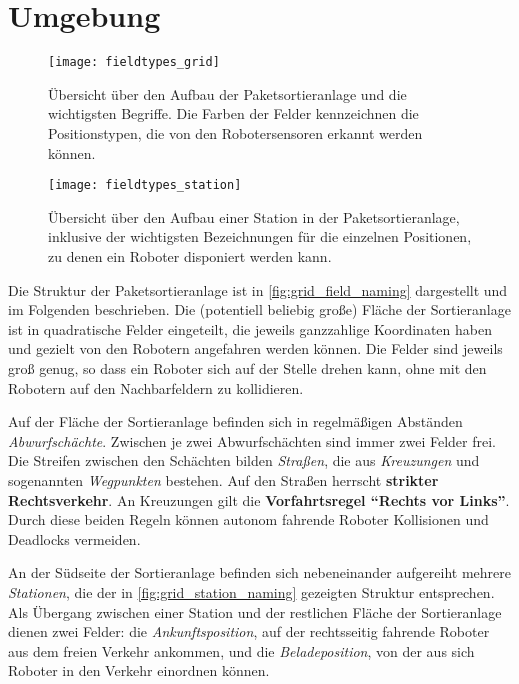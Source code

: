 

\section*{Umgebung}

\begin{figure}
	\centering
	\texttt{[image: fieldtypes\_grid]}
	\caption{Übersicht über den Aufbau der Paketsortieranlage und die wichtigsten Begriffe. Die Farben der Felder kennzeichnen die Positionstypen, die von den Robotersensoren erkannt werden können.}
	\label{fig:grid_field_naming}
\end{figure}



\begin{figure}
    \centering
	\texttt{[image: fieldtypes\_station]}
	\caption{Übersicht über den Aufbau einer Station in der Paketsortieranlage, inklusive der wichtigsten Bezeichnungen für die einzelnen Positionen, zu denen ein Roboter disponiert werden kann.}
	\label{fig:grid_station_naming}
\end{figure}

Die Struktur der Paketsortieranlage ist in \autoref{fig:grid_field_naming} dargestellt und im Folgenden beschrieben. 
Die (potentiell beliebig große) Fläche der Sortieranlage ist in quadratische Felder eingeteilt, die jeweils ganzzahlige Koordinaten haben und gezielt von den Robotern angefahren werden können. 
Die Felder sind jeweils groß genug, so dass ein Roboter sich auf der Stelle drehen kann, ohne mit den Robotern auf den Nachbarfeldern zu kollidieren.

Auf der Fläche der Sortieranlage befinden sich in regelmäßigen Abständen \emph{Abwurfschächte}. 
Zwischen je zwei Abwurfschächten sind immer zwei Felder frei. 
Die Streifen zwischen den Schächten bilden \emph{Straßen}, die aus \emph{Kreuzungen} und sogenannten \emph{Wegpunkten} bestehen.
Auf den Straßen herrscht \textbf{strikter Rechtsverkehr}. 
An Kreuzungen gilt die \textbf{Vorfahrtsregel \enquote{Rechts vor Links}}. 
Durch diese beiden Regeln können autonom fahrende Roboter Kollisionen und Deadlocks vermeiden.

An der Südseite der Sortieranlage befinden sich nebeneinander aufgereiht mehrere \emph{Stationen}, die der in \autoref{fig:grid_station_naming} gezeigten Struktur entsprechen.
Als Übergang zwischen einer Station und der restlichen Fläche der Sortieranlage dienen zwei Felder: die \emph{Ankunftsposition}, auf der rechtsseitig fahrende Roboter aus dem freien Verkehr ankommen, und die \emph{Beladeposition}, von der aus sich Roboter in den Verkehr einordnen können.

